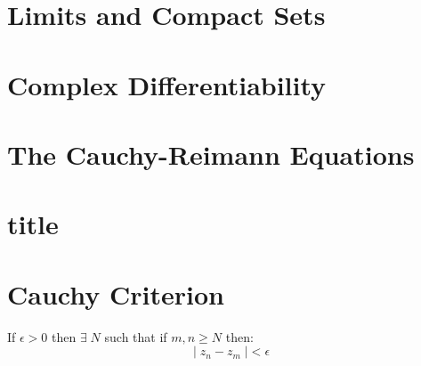 \section{Limits and Compact Sets}
\section{Complex Differentiability}
\section{The Cauchy-Reimann Equations}
\section{title}

\section{Cauchy Criterion}
\begin{defn}
	If $\epsilon > 0$ then $\exists \; N$ such that if $m, n \geq N$ then:
	\[|\; {z}_{n} - {z}_{m} \; | < \epsilon\]
\end{defn}



